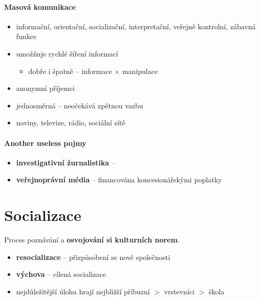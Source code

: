 \paragraph{Masová komunikace}
\begin{itemize}
\item informační, orientační, socializační, interpretační, veřejně kontrolní,
 zábavná funkce
\item umožňuje rychlé šíření informací
	\begin{itemize}
	\item dobře i špatně -- informace $\times$ manipulace
	\end{itemize}
\item anonymní příjemci
\item jednosměrná -- neočekává zpětnou vazbu
\item noviny, televize, rádio, sociální sítě
\end{itemize}

\paragraph{Another useless pojmy}
\begin{itemize}
\item \textbf{investigativní žurnalistika} -- 
\item \textbf{veřejnoprávní média} -- financována koncesionářskými poplatky 
\end{itemize}




\section{Socializace}
Proces poznávání a \textbf{osvojování si kulturních norem}.
\begin{itemize}
\item \textbf{resocializace} -- přizpůsobení se nové společnosti
\item \textbf{výchova} -- cílená socializace
\item nejdůležitější úlohu hrají nejbližší příbuzní $>$ vrstevníci $>$ škola
\end{itemize}

